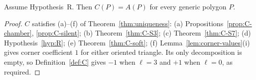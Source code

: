 \begin{theorem}[comparison]\label{thm:comparison}\leanok
Assume Hypothesis~R. Then $C(P)=A(P)$ for every generic polygon $P$.

\end{theorem}
\begin{proof}\leanok{}
$C$ satisfies (a)--(f) of Theorem~\ref{thm:uniqueness}: (a)
Propositions~\ref{prop:C-chamber}, \ref{prop:C-silent}; (b)
Theorem~\ref{thm:C-S3}; (c) Theorem~\ref{thm:C-S7}; (d) Hypothesis~\ref{hyp:R}; (e)
Theorem~\ref{thm:C-soft}; (f) Lemma~\ref{lem:corner-values}(i)
gives corner coefficient $1$ for either oriented triangle. Its only
decomposition is empty, so Definition~\ref{def:C} gives $-1$ when
$\ell=3$ and $+1$ when $\ell=0$, as required.
\end{proof}

